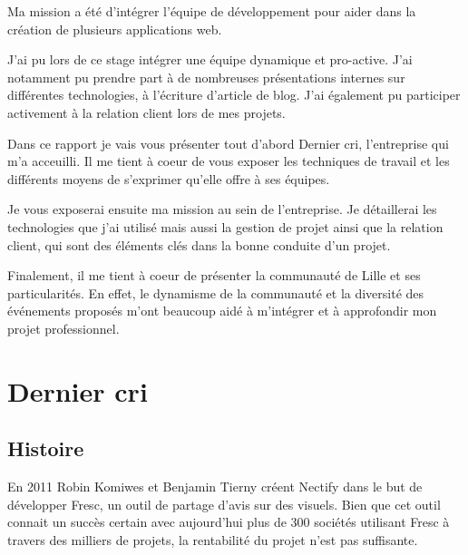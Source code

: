 \documentclass[12pt,a4paper]{article}
\begin{document}
  \bigskip

  Ma mission a été d'intégrer l'équipe de développement pour aider dans la
  création de plusieurs applications web.

  \bigskip

  J'ai pu lors de ce stage intégrer une équipe dynamique et pro-active.
  J'ai notamment pu prendre part à de nombreuses présentations internes
  sur différentes technologies, à l'écriture d'article de blog. J'ai
  également pu participer activement à la relation client lors de mes
  projets.

  \bigskip

  Dans ce rapport je vais vous présenter tout d'abord Dernier cri,
  l'entreprise qui m'a acceuilli. Il me tient à coeur de vous exposer les
  techniques de travail et les différents moyens de s'exprimer qu'elle
  offre à ses équipes.

  \bigskip

  Je vous exposerai ensuite ma mission au sein de l'entreprise. Je
  détaillerai les technologies que j'ai utilisé mais aussi la gestion de
  projet ainsi que la relation client, qui sont des éléments clés dans la
  bonne conduite d'un projet.

  \bigskip

  Finalement, il me tient à coeur de présenter la communauté de Lille et
  ses particularités. En effet, le dynamisme de la communauté et la
  diversité des événements proposés m'ont beaucoup aidé à m'intégrer et à
  approfondir mon projet professionnel.

  \newpage

  \section{Dernier cri}\label{dernier-cri}

  \bigskip

  \subsection{Histoire}\label{histoire}

  \bigskip

  En 2011 Robin Komiwes et Benjamin Tierny créent Nectify dans le but de
  développer Fresc, un outil de partage d'avis sur des visuels. Bien que
  cet outil connait un succès certain avec aujourd'hui plus de 300
  sociétés utilisant Fresc à travers des milliers de projets, la
  rentabilité du projet n'est pas suffisante.
\end{document}

